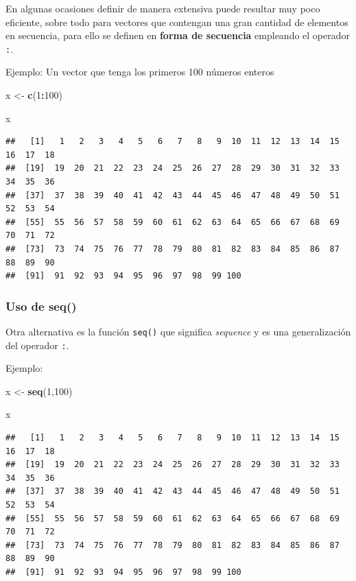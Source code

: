 \documentclass[
]{book}
\newenvironment{Shaded}{\begin{snugshade}}{\end{snugshade}}
\newcommand{\DecValTok}[1]{\textcolor[rgb]{0.00,0.00,0.81}{#1}}
\newcommand{\FunctionTok}[1]{\textcolor[rgb]{0.13,0.29,0.53}{\textbf{#1}}}
\newcommand{\NormalTok}[1]{#1}
\newcommand{\OtherTok}[1]{\textcolor[rgb]{0.56,0.35,0.01}{#1}}
\newcommand{\SpecialCharTok}[1]{\textcolor[rgb]{0.81,0.36,0.00}{\textbf{#1}}}
\begin{document}
En algunas ocasiones definir de manera extensiva puede resultar muy poco eficiente, sobre todo para vectores que contengan una gran cantidad de elementos en secuencia, para ello se definen en \textbf{forma de secuencia} empleando el operador \texttt{:}.

Ejemplo:
Un vector que tenga los primeros 100 números enteros

\begin{Shaded}
\begin{Highlighting}[]
\NormalTok{x }\OtherTok{\textless{}{-}} \FunctionTok{c}\NormalTok{(}\DecValTok{1}\SpecialCharTok{:}\DecValTok{100}\NormalTok{)}

\NormalTok{x}
\end{Highlighting}
\end{Shaded}

\begin{verbatim}
##   [1]   1   2   3   4   5   6   7   8   9  10  11  12  13  14  15  16  17  18
##  [19]  19  20  21  22  23  24  25  26  27  28  29  30  31  32  33  34  35  36
##  [37]  37  38  39  40  41  42  43  44  45  46  47  48  49  50  51  52  53  54
##  [55]  55  56  57  58  59  60  61  62  63  64  65  66  67  68  69  70  71  72
##  [73]  73  74  75  76  77  78  79  80  81  82  83  84  85  86  87  88  89  90
##  [91]  91  92  93  94  95  96  97  98  99 100
\end{verbatim}

\subsubsection{Uso de seq()}\label{uso-de-seq}

Otra alternativa es la función \texttt{seq()} que significa \emph{sequence} y es una generalización del operador \texttt{:}.

Ejemplo:

\begin{Shaded}
\begin{Highlighting}[]
\NormalTok{x }\OtherTok{\textless{}{-}} \FunctionTok{seq}\NormalTok{(}\DecValTok{1}\NormalTok{,}\DecValTok{100}\NormalTok{)}

\NormalTok{x}
\end{Highlighting}
\end{Shaded}

\begin{verbatim}
##   [1]   1   2   3   4   5   6   7   8   9  10  11  12  13  14  15  16  17  18
##  [19]  19  20  21  22  23  24  25  26  27  28  29  30  31  32  33  34  35  36
##  [37]  37  38  39  40  41  42  43  44  45  46  47  48  49  50  51  52  53  54
##  [55]  55  56  57  58  59  60  61  62  63  64  65  66  67  68  69  70  71  72
##  [73]  73  74  75  76  77  78  79  80  81  82  83  84  85  86  87  88  89  90
##  [91]  91  92  93  94  95  96  97  98  99 100
\end{verbatim}
\end{document}

